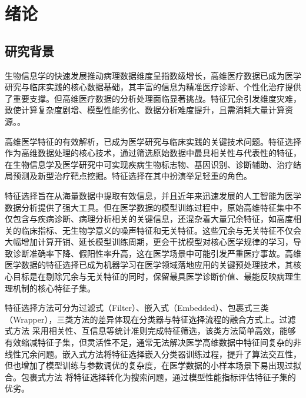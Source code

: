 \documentclass{wzuthesis}
\begin{document}

\frontmatter
\makefirstpage

\mainmatter
\chapter{绪论}
\section {研究背景}
生物信息学的快速发展推动病理数据维度呈指数级增长，高维医疗数据已成为医学研究与临床实践的核心数据基础，其丰富的信息为精准医疗诊断、个性化治疗提供了重要支撑。但高维医疗数据的分析处理面临显著挑战。特征冗余引发维度灾难，致使计算复杂度剧增、模型性能劣化、数据分析难度提升，且需消耗大量计算资源。。

高维医学特征的有效解析，已成为医学研究与临床实践的关键技术问题。特征选择作为高维数据处理的核心技术，通过筛选原始数据中最具相关性与代表性的特征，在生物信息学及医学研究中可实现疾病生物标志物、基因识别、诊断辅助、治疗结局预测及新型治疗靶点挖掘。特征选择在其中扮演举足轻重的角色。

特征选择旨在从海量数据中提取有效信息，并且近年来迅速发展的人工智能为医学数据分析提供了强大工具。但在医学数据的模型训练过程中，原始高维特征集中不仅包含与疾病诊断、病理分析相关的关键信息，还混杂着大量冗余特征，如高度相关的临床指标、无生物学意义的噪声特征和无关特征。这些冗余与无关特征不仅会大幅增加计算开销、延长模型训练周期，更会干扰模型对核心医学规律的学习，导致诊断准确率下降、假阳性率升高，这在医学场景中可能引发严重医疗事故。高维医学数据的特征选择已成为机器学习在医学领域落地应用的关键预处理技术，其核心目标是在剔除冗余与无关特征的同时，保留最具医学诊断价值、最能反映病理生理机制的核心特征子集。

特征选择方法可分为过滤式（Filter）、嵌入式（Embedded）、包裹式三类（Wrapper），三类方法的差异体现在分类器与特征选择流程的融合方式上。过滤式方法 采用相关性、互信息等统计准则完成特征筛选，该类方法简单高效，能够有效缩减特征子集，但灵活性不足，通常无法解决医学高维数据中特征间复杂的非线性冗余问题。嵌入式方法将特征选择嵌入分类器训练过程，提升了算法交互性，但也增加了模型训练与参数调优的复杂度，在医学数据的小样本场景下易出现过拟合。包裹式方法 将特征选择转化为搜索问题，通过模型性能指标评估特征子集的优劣。
\end{document}
